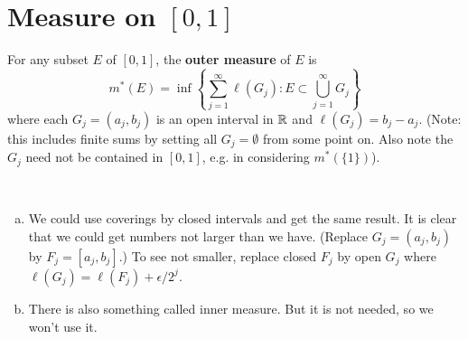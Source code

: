 \chapter{Measure on $[0, 1]$}

\begin{defn}\label{d:outermeasure}%
	For any subset $E$ of $[0,1]$, the \textbf{outer measure} 
	of $E$ is 
	\begin{equation*}
		m^\ast(E) = \inf\left\{\sum\limits_{j=1}^\infty \ell(G_j) 
		: E \subset \bigcup\limits_{j=1}^\infty G_j\right\}
	\end{equation*}
	where each $G_j = (a_j,b_j)$ is an open interval in $\mathbb{R}$ and 
	$\ell(G_j) = b_j - a_j$. (Note: this includes finite sums by 
	setting all $G_j = \emptyset$ from some point on. Also note the $G_j$ 
	need not be contained in $[0,1]$, e.g. in considering $m^\ast(\{1\})$). 
\end{defn}

\begin{rmk}~ %
	\begin{enumerate}[(a)]
		\item We could use coverings by closed intervals and get the same 
		result. It is clear that we could get numbers not larger than we 
		have. (Replace $G_j = (a_j, b_j)$ by $F_j = [a_j, b_j]$.) To 
		see not smaller, replace closed $F_j$ by open $G_j$ where 
		$\ell(G_j) = \ell(F_j) + \epsilon / 2^j$. 
		\item There is also something called inner measure. But it is not 
		needed, so we won't use it. 
	\end{enumerate}
\end{rmk}

